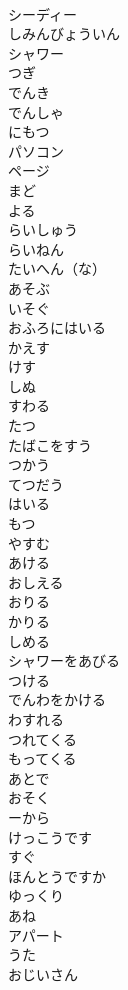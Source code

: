 \documentclass[8pt]{extreport}
\begin{document}
\begin{CJK}{UTF8}{min}
\\	シーディー	
\\	しみんびょういん	
\\	シャワー	
\\	つぎ	
\\	でんき	
\\	でんしゃ	
\\	にもつ	
\\	パソコン	
\\	ページ	
\\	まど	
\\	よる	
\\	らいしゅう	
\\	らいねん	
\\	たいへん（な）	
\\	あそぶ	
\\	いそぐ	
\\	おふろにはいる	
\\	かえす	
\\	けす	
\\	しぬ	
\\	すわる	
\\	たつ	
\\	たばこをすう	
\\	つかう	
\\	てつだう	
\\	はいる	
\\	もつ	
\\	やすむ	
\\	あける	
\\	おしえる	
\\	おりる	
\\	かりる	
\\	しめる	
\\	シャワーをあびる	
\\	つける	
\\	でんわをかける	
\\	わすれる	
\\	つれてくる	
\\	もってくる	
\\	あとで	
\\	おそく	
\\	ーから	
\\	けっこうです	
\\	すぐ	
\\	ほんとうですか	
\\	ゆっくり	
\\	あね	
\\	アパート	
\\	うた	
\\	おじいさん	

\end{CJK}
\end{document}
